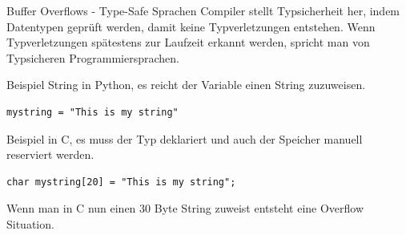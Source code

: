 \documentclass[10pt]{beamer}
\begin{document}
\begin{frame}[fragile]{Buffer Overflows - Type-Safe Sprachen}
  Compiler stellt Typsicherheit her, indem Datentypen gepr\"uft werden, damit keine Typverletzungen entstehen.
  Wenn Typverletzungen sp\"atestens zur Laufzeit erkannt werden, spricht man von Typsicheren Programmiersprachen.

  Beispiel String in Python, es reicht der Variable einen String zuzuweisen.
  \begin{lstlisting}[style=CStyle]
    mystring = "This is my string"
  \end{lstlisting}

  Beispiel in C, es muss der Typ deklariert und auch der Speicher manuell reserviert werden.
  \begin{lstlisting}[style=CStyle]
    char mystring[20] = "This is my string";
  \end{lstlisting}
  Wenn man in C nun einen 30 Byte String zuweist entsteht eine Overflow Situation.
\end{frame}
\end{document}
